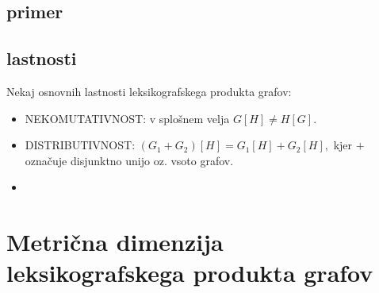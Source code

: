 \documentclass[mat1, tisk]{fmfdelo}
\begin{document}

\subsection{primer}


\subsection{lastnosti}
Nekaj osnovnih lastnosti leksikografskega produkta grafov:
\begin{itemize}
    \item NEKOMUTATIVNOST: v splošnem velja $G[H] \neq H[G].$
    \item DISTRIBUTIVNOST: $(G_1 + G_2)[H] = G_1[H] + G_2[H],$ kjer $+$ označuje disjunktno unijo oz. vsoto grafov.
    \item 
\end{itemize}


\section{Metrična dimenzija leksikografskega produkta grafov}

\end{document}
